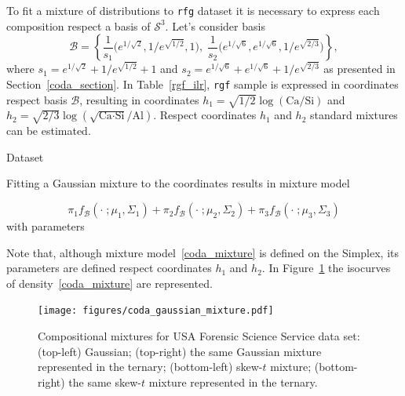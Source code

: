 \documentclass[10pt, a4paper]{article}
\begin{document}
To fit a mixture of distributions to \texttt{rfg} dataset it is necessary to express each composition respect a basis of $\mathcal{S}^3$. Let's consider basis 
\begin{equation}
\mathcal{B} = \left\{ \frac{1}{s_1}\Big( e^{1/\sqrt{2}}, 1/e^{\sqrt{1/2}}, 1 \Big), \; \frac{1}{s_2}\Big( e^{1/\sqrt{6}}, e^{1/\sqrt{6}}, 1/e^{\sqrt{2/3}} \Big) \right\},
\end{equation}
where $s_1 = e^{1/\sqrt{2}} + 1/e^{\sqrt{ 1/2}} + 1$ and $s_2= e^{1/\sqrt{6}} + e^{1/\sqrt{6}} + 1/e^{\sqrt{2/3}}$ as presented in Section~\ref{coda_section}. In Table~\ref{rgf_ilr}, \texttt{rgf} sample is expressed in coordinates respect basis $\mathcal{B}$, resulting in coordinates $h_1 = \sqrt{1/2} \log(\text{Ca}/\text{Si})$ and $h_2 = \sqrt{2/3} \log(\sqrt{\text{Ca} \cdot \text{Si}} / \text{Al})$. Respect coordinates $h_1$ and $h_2$ standard mixtures can be estimated.

\begin{table}
\centering
\scriptsize

\quad

\label{rgf_ilr}
\caption{Dataset}
\end{table}

Fitting a Gaussian mixture to the coordinates results in mixture model

\begin{equation}\label{coda_mixture}
\pi_1 f_{\mathcal{B}}(\cdot\;; \mu_1, \Sigma_1) + \pi_2 f_{\mathcal{B}}(\cdot\;; \mu_2, \Sigma_2) + \pi_3 f_{\mathcal{B}}(\cdot\;; \mu_3, \Sigma_3)
\end{equation}
with parameters

{\small  }

Note that, although mixture model~\ref{coda_mixture} is defined on the Simplex, its parameters are defined respect coordinates $h_1$ and $h_2$. In Figure~\ref{fig07fittingcodaGaussian} the isocurves of density~\ref{coda_mixture} are represented.

\begin{figure}[htbp]
\centering
\texttt{[image: figures/coda\_gaussian\_mixture.pdf]}\\
\caption{Compositional mixtures for USA Forensic Science Service data set: (top-left) Gaussian; (top-right) the same Gaussian mixture represented in the ternary; (bottom-left) skew-$t$ mixture; (bottom-right) the same skew-$t$ mixture represented in the ternary. }
\label{fig07fittingcodaGaussian}
\end{figure}
\end{document}
